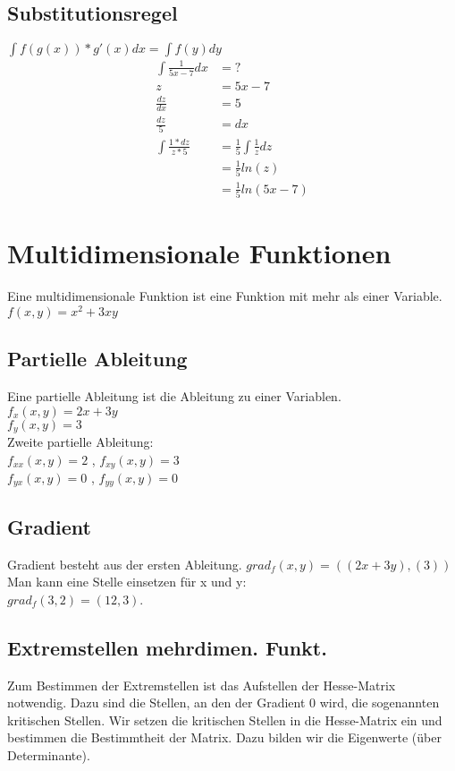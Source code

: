 \documentclass[a4paper,landscape, 11pt]{article}
\begin{document}
\begin{multicols}{5}
\begin{small}
        \subsection{Substitutionsregel}
        $\int f(g(x)) * g'(x) dx = \int f(y) dy$
        \begin{align}
            \int \frac{1}{5x - 7} dx &= ?\\
            z &= 5x - 7 \\
            \frac{dz}{dx} &= 5 \\   
            \frac{dz}{5} &= dx  \\
            \int \frac{1 * dz}{z * 5} &= \frac{1}{5} \int \frac{1}{z} dz \\
                                      &= \frac{1}{5} ln(z) \\
                                      &= \frac{1}{5} ln(5x-7)
        \end{align}
    \section{Multidimensionale Funktionen}
        Eine multidimensionale Funktion ist eine Funktion mit mehr als einer Variable.\\
       $f(x,y) = x^2 + 3xy$  
       
       \subsection{Partielle Ableitung}
       Eine partielle Ableitung ist die Ableitung zu einer Variablen.\\
       $f_x(x,y) = 2x + 3y$ \\
       $f_y(x,y) = 3$ \\
       Zweite partielle Ableitung: \\
       $f_{xx}(x,y) = 2$ , 
       $f_{xy}(x,y) = 3$ \\
       $f_{yx}(x,y) = 0$ ,
       $f_{yy}(x,y) = 0$ 
       \subsection{Gradient}
       Gradient besteht aus der ersten Ableitung.
       $grad_f(x,y) = ((2x + 3y), (3))$ \\
       Man kann eine Stelle einsetzen für x und y:\\
       $grad_f(3,2)= (12, 3)$.
              
       \subsection{Extremstellen mehrdimen. Funkt.}
       Zum Bestimmen der Extremstellen ist das Aufstellen der Hesse-Matrix notwendig.
       Dazu sind die Stellen, an den der Gradient 0 wird, die sogenannten kritischen Stellen. Wir setzen die kritischen Stellen in die Hesse-Matrix ein und bestimmen die Bestimmtheit der Matrix. Dazu bilden wir die Eigenwerte (über Determinante).\\
       

\end{small}
\end{multicols}
\end{document}
